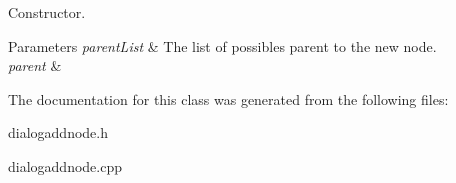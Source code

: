 Constructor. 


\begin{DoxyParams}{Parameters}
{\em parent\-List} & The list of possibles parent to the new node. \\
\hline
{\em parent} & \\
\hline
\end{DoxyParams}


The documentation for this class was generated from the following files\-:\begin{DoxyCompactItemize}
\item 
dialogaddnode.\-h\item 
dialogaddnode.\-cpp\end{DoxyCompactItemize}
